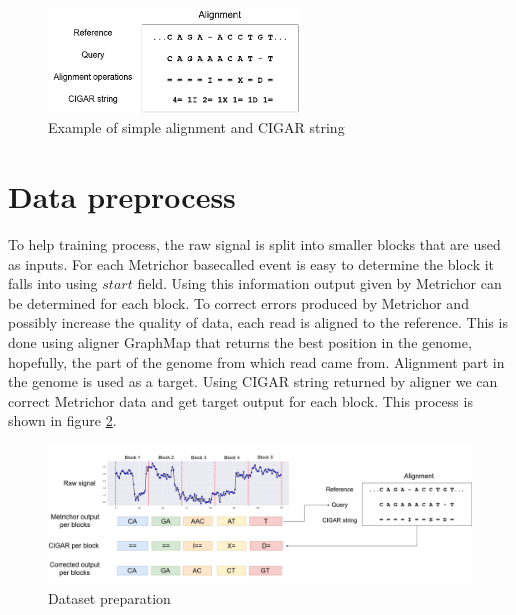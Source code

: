 \documentclass[times, utf8, diplomski, numeric, english]{fer}
\begin{document}
\begin{figure}[!ht]
	\begin{center}
		\includegraphics[width=0.6\textwidth]{./imgs/alignment.png}
		\caption{Example of simple alignment and CIGAR string}
		\label{fg:align}
	\end{center}
\end{figure} 


\section{Data preprocess}

To help training process, the raw signal is split into smaller blocks that are used as inputs. For each Metrichor basecalled event is easy to determine the block it falls into using $start$ field. Using this information output given by Metrichor can be determined for each block. 
To correct errors produced by Metrichor and possibly increase the quality of data, each read is aligned to the reference. This is done using aligner GraphMap\cite{sovic} that returns the best position in the genome, hopefully, the part of the genome from which read came from.
Alignment part in the genome is used as a target. Using CIGAR string returned by aligner we can correct Metrichor data and get target output for each block. This process is shown in figure \ref{fg:data_correction}.

\begin{figure}[!ht]
	\begin{center}
		\includegraphics[width=1\textwidth]{./imgs/train_data_correction.png}
		\caption{Dataset preparation}
		\label{fg:data_correction}
	\end{center}
\end{figure}
\end{document}

